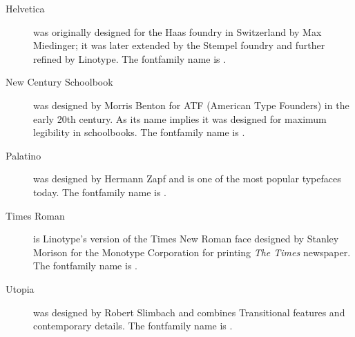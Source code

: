 \begin{description}
\item[Helvetica] { was originally 
designed for the Haas
foundry in Switzerland by Max Miedinger; it was later
extended by the Stempel foundry and further refined by 
Linotype.
The fontfamily name is .

\vspace{0.5\onelineskip}
\fox\par\Kafka\par\namesAZ
\vspace{0.5\onelineskip}
}

\item[New Century Schoolbook] 
  {
was designed by Morris Benton for ATF (American
Type Founders) in the early 20th century. As its name implies it was designed
for maximum legibility in schoolbooks.
The fontfamily name is .

\vspace{0.5\onelineskip}
\fox\par\Kafka\par\namesAZ
\vspace{0.5\onelineskip}
}

\item[Palatino] 
  { was designed by Hermann 
Zapf and is one of the most popular typefaces today.
The fontfamily name is .

\vspace{0.5\onelineskip}
\fox\par\Kafka\par\namesAZ
\vspace{0.5\onelineskip}
}

\item[Times Roman] 
  { is Linotype's version
of the Times New Roman face designed by 
Stanley Morison for the
Monotype Corporation for printing \emph{The Times} newspaper.
The fontfamily name is .

\vspace{0.5\onelineskip}
\fox\par\Kafka\par\namesAZ
\vspace{0.5\onelineskip}
}

\item[Utopia] 
  { was designed by Robert 
Slimbach and combines 
Transitional features and contemporary details.
The fontfamily name is .

}
\end{description}
